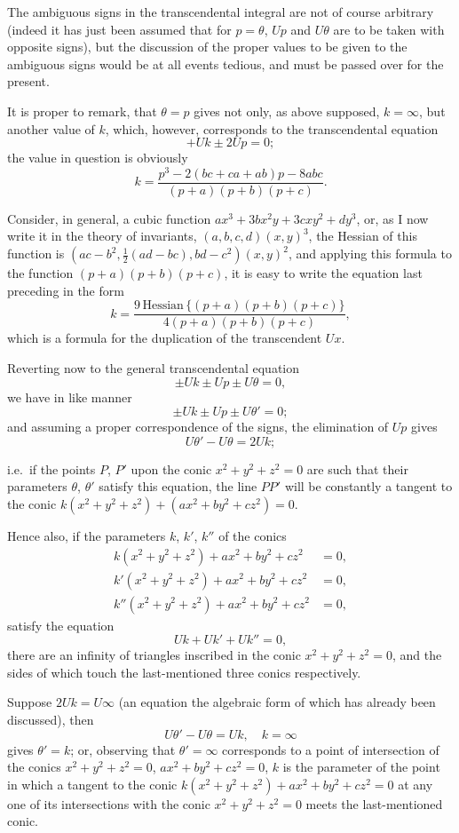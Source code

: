 \documentclass[11pt,a4paper]{book}
\begin{document}
The ambiguous signs in the transcendental integral are not of course arbitrary (indeed it has just been assumed that for $p=\theta$, $Up$ and $U\theta$ are to be taken with opposite signs), but the discussion of the proper values to be given to the ambiguous signs would be at all events tedious, and must be passed over for the present.

It is proper to remark, that $\theta=p$ gives not only, as above supposed, $k=\infty$, but another value of $k$, which, however, corresponds to the transcendental equation
\[
+ Uk \pm 2Up = 0;
\]
the value in question is obviously
\[
k = \frac{p^3 - 2(bc+ca+ab)p - 8abc}{(p+a)(p+b)(p+c)}.
\]

Consider, in general, a cubic function $ax^3 + 3bx^2y + 3cxy^2 + dy^3$, or, as I now write it in the theory of invariants, $(a,b,c,d)(x,y)^3$, the Hessian of this function is $(ac-b^2, \frac{1}{2}(ad-bc), bd-c^2)(x,y)^2$, and applying this formula to the function $(p+a)(p+b)(p+c)$, it is easy to write the equation last preceding in the form
\[
k = \frac{9\,\text{Hessian}\,\{(p+a)(p+b)(p+c)\}}{4(p+a)(p+b)(p+c)},
\]
which is a formula for the duplication of the transcendent $Ux$.

Reverting now to the general transcendental equation
\[
\pm Uk \pm Up \pm U\theta = 0,
\]
we have in like manner
\[
\pm Uk \pm Up \pm U\theta' = 0;
\]
and assuming a proper correspondence of the signs, the elimination of $Up$ gives
\[
U\theta' - U\theta = 2Uk;
\]

\newpage
\setcounter{page}{56}

i.e.\ if the points $P$, $P'$ upon the conic $x^2+y^2+z^2=0$ are such that their parameters $\theta$, $\theta'$ satisfy this equation, the line $PP'$ will be constantly a tangent to the conic $k(x^2+y^2+z^2)+(ax^2+by^2+cz^2)=0$.

Hence also, if the parameters $k$, $k'$, $k''$ of the conics
\begin{align*}
k(x^2+y^2+z^2) + ax^2 + by^2 + cz^2 &= 0,\\
k'(x^2+y^2+z^2) + ax^2 + by^2 + cz^2 &= 0,\\
k''(x^2+y^2+z^2) + ax^2 + by^2 + cz^2 &= 0,
\end{align*}
satisfy the equation
\[
Uk + Uk' + Uk'' = 0,
\]
there are an infinity of triangles inscribed in the conic $x^2+y^2+z^2=0$, and the sides of which touch the last-mentioned three conics respectively.

Suppose $2Uk = U\infty$ (an equation the algebraic form of which has already been discussed), then
\[
U\theta' - U\theta = Uk, \quad k = \infty
\]
gives $\theta' = k$; or, observing that $\theta' = \infty$ corresponds to a point of intersection of the conics $x^2+y^2+z^2=0$, $ax^2+by^2+cz^2=0$, $k$ is the parameter of the point in which a tangent to the conic $k(x^2+y^2+z^2)+ax^2+by^2+cz^2=0$ at any one of its intersections with the conic $x^2+y^2+z^2=0$ meets the last-mentioned conic.
\end{document}
